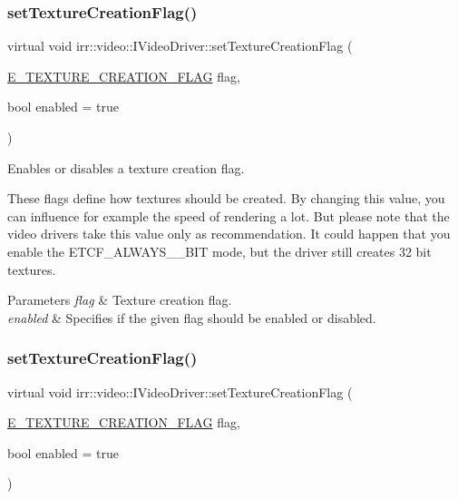 \subsubsection{\texorpdfstring{set\+Texture\+Creation\+Flag()}{setTextureCreationFlag()}\hspace{0.1cm}{\footnotesize\ttfamily [1/2]}}
{\footnotesize\ttfamily virtual void irr\+::video\+::\+I\+Video\+Driver\+::set\+Texture\+Creation\+Flag (\begin{DoxyParamCaption}\item[{\hyperlink{namespaceirr_1_1video_acaf6f7414534f7d62bff18c5bf11876f}{E\+\_\+\+T\+E\+X\+T\+U\+R\+E\+\_\+\+C\+R\+E\+A\+T\+I\+O\+N\+\_\+\+F\+L\+AG}}]{flag,  }\item[{bool}]{enabled = {\ttfamily true} }\end{DoxyParamCaption})\hspace{0.3cm}{\ttfamily [pure virtual]}}



Enables or disables a texture creation flag. 

These flags define how textures should be created. By changing this value, you can influence for example the speed of rendering a lot. But please note that the video drivers take this value only as recommendation. It could happen that you enable the E\+T\+C\+F\+\_\+\+A\+L\+W\+A\+Y\+S\+\_\+\_\+\+B\+IT mode, but the driver still creates 32 bit textures. 
\begin{DoxyParams}{Parameters}
{\em flag} & Texture creation flag. \\
\hline
{\em enabled} & Specifies if the given flag should be enabled or disabled. \\
\hline
\end{DoxyParams}
\mbox{\label{classirr_1_1video_1_1IVideoDriver_a868b58a6b86b9e4841ca3879ce246c4e}} 
\subsubsection{\texorpdfstring{set\+Texture\+Creation\+Flag()}{setTextureCreationFlag()}\hspace{0.1cm}{\footnotesize\ttfamily [2/2]}}
{\footnotesize\ttfamily virtual void irr\+::video\+::\+I\+Video\+Driver\+::set\+Texture\+Creation\+Flag (\begin{DoxyParamCaption}\item[{\hyperlink{namespaceirr_1_1video_acaf6f7414534f7d62bff18c5bf11876f}{E\+\_\+\+T\+E\+X\+T\+U\+R\+E\+\_\+\+C\+R\+E\+A\+T\+I\+O\+N\+\_\+\+F\+L\+AG}}]{flag,  }\item[{bool}]{enabled = {\ttfamily true} }\end{DoxyParamCaption})\hspace{0.3cm}{\ttfamily [pure virtual]}}



